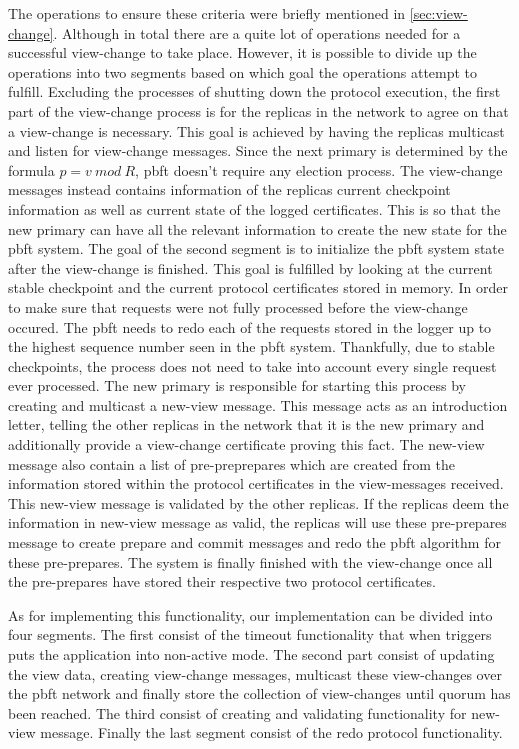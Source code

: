 The operations to ensure these criteria were briefly mentioned in \autoref{sec:view-change}. Although in total there are a quite lot of operations needed for a successful view-change to take place. However, it is possible to divide up the operations into two segments based on which goal the operations attempt to fulfill. Excluding the processes of shutting down the protocol execution, the first part of the view-change process is for the replicas in the network to agree on that a view-change is necessary. This goal is achieved by having the replicas multicast and listen for view-change messages. Since the next primary is determined by the formula $p = v ~mod~ R$, \ac{pbft} doesn't require any election process. The view-change messages instead contains information of the replicas current checkpoint information as well as current state of the logged certificates. This is so that the new primary can have all the relevant information to create the new state for the \ac{pbft} system. The goal of the second segment is to initialize the \ac{pbft} system state after the view-change is finished. This goal is fulfilled by looking at the current stable checkpoint and the current protocol certificates stored in memory. In order to make sure that requests were not fully processed before the view-change occured. The \ac{pbft} needs to redo each of the requests stored in the logger up to the highest sequence number seen in the \ac{pbft} system. Thankfully, due to stable checkpoints, the process does not need to take into account every single request ever processed. The new primary is responsible for starting this process by creating and multicast a new-view message. This message acts as an introduction letter, telling the other replicas in the network that it is the new primary and additionally provide a view-change certificate proving this fact. The new-view message also contain a list of pre-preprepares which are created from the information stored within the protocol certificates in the view-messages received. This new-view message is validated by the other replicas. If the replicas deem the information in new-view message as valid, the replicas will use these pre-prepares message to create prepare and commit messages and redo the \ac{pbft} algorithm for these pre-prepares. The system is finally finished with the view-change once all the pre-prepares have stored their respective two protocol certificates. 

As for implementing this functionality, our implementation can be divided into four segments. The first consist of the timeout functionality that when triggers puts the application into non-active mode. The second part consist of updating the view data, creating view-change messages, multicast these view-changes over the \ac{pbft} network and finally store the collection of view-changes until quorum has been reached. The third consist of creating and validating functionality for new-view message. Finally the last segment consist of the redo protocol functionality. 

